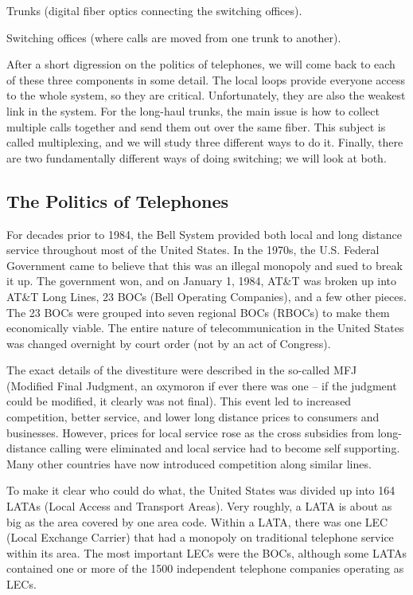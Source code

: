 \documentclass[b5paper,11pt]{memoir}
\begin{document}
{}

Trunks (digital fiber optics connecting the switching offices).

{}

Switching offices (where calls are moved from one trunk to another).

After a short digression on the politics of telephones, we will come
back to each of these three components in some detail. The local loops
provide everyone access to the whole system, so they are critical.
Unfortunately, they are also the weakest link in the system. For the
long-haul trunks, the main issue is how to collect multiple calls
together and send them out over the same fiber. This subject is called
multiplexing, and we will study three different ways to do it. Finally,
there are two fundamentally different ways of doing switching; we will
look at both.

\protect\hypertarget{0130661023_ch02lev1sec5.htmlux5cux23ch02lev2sec18}{}{}

\subsection{The Politics of Telephones}

For decades prior to 1984, the Bell System provided both local and long
distance service throughout most of the United States. In the 1970s, the
U.S. Federal Government came to believe that this was an illegal
monopoly and sued to break it up. The government won, and on January 1,
1984, AT\&T was broken up into AT\&T Long Lines, 23 {BOC}s ({Bell
Operating Companies}), and a few other pieces. The 23 BOCs were grouped
into seven regional BOCs (RBOCs) to make them economically viable. The
entire nature of telecommunication in the United States was changed
overnight by court order ({not} by an act of Congress).

The exact details of the divestiture were described in the so-called
{MFJ} ({Modified Final Judgment}, an oxymoron if ever there was one -- if
the judgment could be modified, it clearly was not final). This event
led to increased competition, better service, and lower long distance
prices to consumers and businesses. However, prices for local service
rose as the cross subsidies from long-distance calling were eliminated
and local service had to become self supporting. Many other countries
have now introduced competition along similar lines.

To make it clear who could do what, the United States was divided up
into 164 {LATA}s ({Local Access and Transport Areas}). Very roughly, a
LATA is about as big as the area covered by one area code. Within a
LATA, there was one {LEC} ({Local Exchange Carrier}) that had a monopoly
on traditional telephone service within its area. The most important
LECs were the BOCs, although some LATAs contained one or more of the
1500 independent telephone companies operating as LECs.
\end{document}
